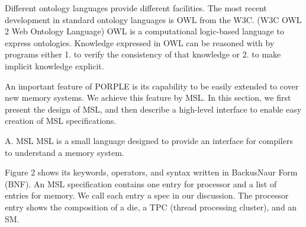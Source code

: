 \documentclass{sig-alternate}
\begin{document}
Different ontology languages provide different facilities. The most recent development in standard ontology languages is OWL from the W3C. (W3C OWL 2 Web Ontology Language)
OWL is a computational logic-based language to express ontologies. Knowledge expressed in OWL can be reasoned with by programs either 1. to verify the consistency of that knowledge or 2. to make implicit knowledge explicit.





An important feature of PORPLE is its capability to be easily extended to cover new memory systems. We achieve this feature by MSL. In this section, we first present the design of MSL, and then describe a high-level interface to enable easy creation of MSL specifications.

A. MSL
MSL is a small language designed to provide an interface for compilers to understand a memory system.

Figure 2 shows its keywords, operators, and syntax written in BackusNaur Form (BNF). An MSL specification contains one entry for processor and a list of entries for memory. We call each entry a spec in our discussion. The processor entry shows the composition of a die, a TPC (thread processing cluster), and an SM.
\end{document}
